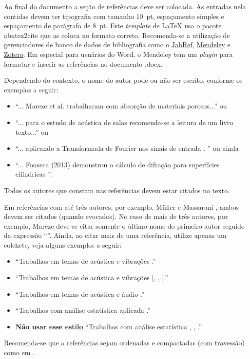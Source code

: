 \documentclass[12pt, a4paper, twoside, twocolumn]{article}
\begin{document}
Ao final do documento a seção de referências deve ser colocada. As entradas nela contidas devem ter tipografia com tamanho 10~pt, espaçamento simples e espaçamento de parágrafo de 8~pt. Este \textit{template} de \LaTeX\xspace usa o pacote {\ttfamily abntex2cite} que as coloca no formato correto. Recomenda-se a utilização de gerenciadores de banco de dados de bibliografia como o \href{http://www.jabref.org/}{JabRef}, \href{http://www.mendeley.com}{Mendeley} e \href{https://www.zotero.org/}{Zotero}. Em especial para usuários do Word, o Mendeley tem um \textit{plugin} para formatar e inserir as referências no documento .docx.


Dependendo do contexto, o nome do autor pode ou não ser escrito, conforme os exemplos a seguir: 
%
\begin{itemize}[noitemsep,topsep=0ex] \itemsep=4pt
	\item 	``... Mareze et al. \cite{Mareze-2019} trabalharam com absorção de materiais porosos...'' ou 
	
	\item ``... para o estudo de acústica de salas \cite{Brandao-2017} recomenda-se a leitura de um livro texto...'' ou
	\item ``... aplicando a Transformada de Fourier nos sinais de entrada \cite{Oppenheim-2010}. '' ou ainda
	\item ``... Fonseca (2013) demonstrou o cálculo de difração para superfícies cilíndricas \cite{Fonseca-2013}''.
\end{itemize}
%
Todos os autores que constam nas referências devem estar citados no texto.

Em referências com até três autores, por exemplo, Müller e Massarani \cite{Muller-2001}, ambos devem ser citados (quando evocados). No caso de mais de três autores, por exemplo, Mareze \etal \cite{Mareze-2019} deve-se citar somente o último nome do primeiro autor seguido da expressão ``\etal''. Ainda, ao citar mais de uma referência, utilize apenas um colchete, veja alguns exemplos a seguir:
%
\begin{itemize}[noitemsep,topsep=0ex] \itemsep=8pt
	\item 	``Trabalhos em temas de acústica e vibrações \cite{Mareze-2017,Fonseca-2013,Brandao-2017}.''
	\item 	``Trabalhos em temas de acústica e vibrações [, , ].''
	\item ``Trabalhos em temas de acústica  e áudio \cite{Mareze-2017,Oppenheim-2010,Muller-2001,Mareze-2019}.''
	\item ``Trabalhos com análise estatística aplicada \cite{Mareze-2017, Brandao-2017, Borges-2018}.''
		\item \textbf{Não usar esse estilo} ``Trabalhos com análise estatística \cite{Mareze-2017}, \cite{Brandao-2017}, \cite{Ristow-2016}.''
\end{itemize}
%
Recomenda-se que a referências sejam ordenadas e compactadas (com travessão) como em \cite{Mareze-2017,Oppenheim-2010,Muller-2001,Mareze-2019}.
\end{document}
